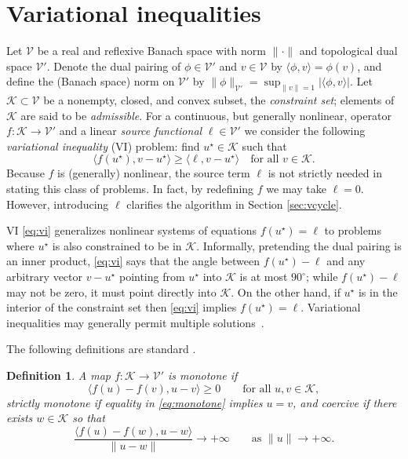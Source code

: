 \documentclass[letterpaper,final,12pt,reqno]{amsart}
\theoremstyle{cstyle}
\theoremstyle{cstyle*}
\theoremstyle{dstyle}
\newtheorem{definition}[theorem]{Definition}
\numberwithin{equation}{section}
\numberwithin{figure}{section}
\numberwithin{table}{section}
\numberwithin{theorem}{section}
\newcommand{\cK}{\mathcal{K}}
\newcommand{\cV}{\mathcal{V}}
\newcommand{\ip}[2]{\langle#1,#2\rangle}
\begin{document}
\section{Variational inequalities} \label{sec:vi}

Let $\cV$ be a real and reflexive Banach space with norm $\|\cdot\|$ and topological dual space $\cV'$.  Denote the dual pairing of $\phi \in \cV'$ and $v\in\cV$ by $\ip{\phi}{v} = \phi(v)$, and define the (Banach space) norm on $\cV'$ by $\|\phi\|_{\cV'} = \sup_{\|v\|=1} |\ip{\phi}{v}|$.  Let $\cK \subset \cV$ be a nonempty, closed, and convex subset, the \emph{constraint set}; elements of $\cK$ are said to be \emph{admissible}.  For a continuous, but generally nonlinear, operator $f:\cK \to \cV'$ and a linear \emph{source functional} $\ell\in \cV'$ we consider the following \emph{variational inequality} (VI) problem: find $u^\star\in \cK$ such that
\begin{equation}
\ip{f(u^\star)}{v-u^\star} \ge \ip{\ell}{v-u^\star} \quad \text{for all } v\in \cK. \label{eq:vi}
\end{equation}
Because $f$ is (generally) nonlinear, the source term $\ell$ is not strictly needed in stating this class of problems.  In fact, by redefining $f$ we may take $\ell=0$.  However, introducing $\ell$ clarifies the algorithm in Section \ref{sec:vcycle}.

VI \eqref{eq:vi} generalizes nonlinear systems of equations $f(u^\star)=\ell$ to problems where $u^\star$ is also constrained to be in $\cK$.  Informally, pretending the dual pairing is an inner product, \eqref{eq:vi} says that the angle between $f(u^\star)-\ell$ and any arbitrary vector $v-u^\star$ pointing from $u^\star$ into $\cK$ is at most $90^\circ$; while $f(u^\star)-\ell$ may not be zero, it must point directly into $\cK$.  On the other hand, if $u^\star$ is in the interior of the constraint set then \eqref{eq:vi} implies $f(u^\star)=\ell$.
Variational inequalities may generally permit multiple solutions~\cite{Farrell2019}.

The following definitions are standard \cite{KinderlehrerStampacchia1980}.

\begin{definition}  A map $f:\cK \to \cV'$ is \emph{monotone} if
\begin{equation}
\ip{f(u)-f(v)}{u-v} \ge 0 \qquad \text{for all } u,v \in \cK, \label{eq:monotone}
\end{equation}
\emph{strictly monotone} if equality in \eqref{eq:monotone} implies $u=v$, and \emph{coercive} if there exists $w \in \cK$ so that
\begin{equation}
\frac{\ip{f(u)-f(w)}{u-w}}{\|u-w\|} \to +\infty \qquad \text{as } \|u\|\to +\infty. \label{eq:coercive}
\end{equation}
\end{definition}
\end{document}
